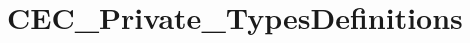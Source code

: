 \hypertarget{group___c_e_c___private___types_definitions}{}\section{C\+E\+C\+\_\+\+Private\+\_\+\+Types\+Definitions}
\label{group___c_e_c___private___types_definitions}
